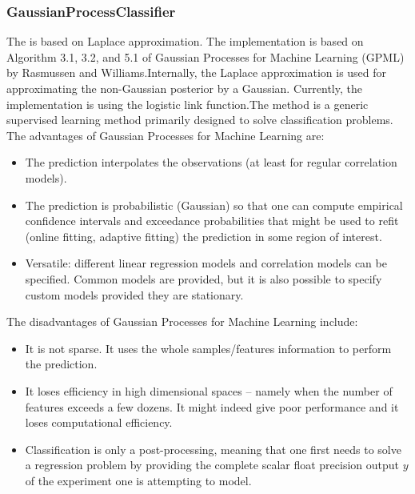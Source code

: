 \subsubsection{GaussianProcessClassifier}
  The  is based on Laplace approximation. The implementation
  is based on Algorithm 3.1, 3.2, and 5.1 of Gaussian Processes for Machine Learning (GPML) by
  Rasmussen and Williams.Internally, the Laplace approximation is used for approximating the
  non-Gaussian posterior by a Gaussian. Currently, the implementation is using the
  logistic link function.The method is a generic supervised learning                          method
  primarily designed to solve classification problems.                          The advantages of
  Gaussian Processes for Machine Learning are:                          \begin{itemize}
  \item The prediction interpolates the observations (at least for regular
  correlation models).                            \item The prediction is probabilistic (Gaussian)
  so that one can compute                            empirical confidence intervals and exceedance
  probabilities that might be used                            to refit (online fitting, adaptive
  fitting) the prediction in some region of                            interest.
  \item Versatile: different linear regression models and correlation models can
  be specified.                            Common models are provided, but it is also possible to
  specify custom models                            provided they are stationary.
  \end{itemize}                          The disadvantages of Gaussian Processes for Machine
  Learning include:                          \begin{itemize}                            \item It is
  not sparse.                            It uses the whole samples/features information to perform
  the prediction.                            \item It loses efficiency in high dimensional spaces –
  namely when the                            number of features exceeds a few dozens.
  It might indeed give poor performance and it loses computational efficiency.
  \item Classification is only a post-processing, meaning that one first needs
  to solve a regression problem by providing the complete scalar float precision
  output $y$ of the experiment one is attempting to model.                          \end{itemize}

